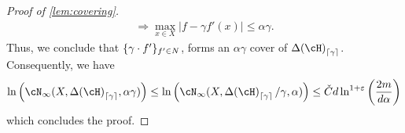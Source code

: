 \begin{proof}[Proof of \cref{lem:covering}]
\begin{align}
     \Rightarrow
     \max_{x\in X} \left|f-\gamma f'(x) \right| \leq \alpha\gamma.
    \end{align}
Thus, we conclude that $ \{ \gamma \cdot f' \}_{f'\in N } $, forms an $ \alpha \gamma $  cover of $ \dlh_{\left\lceil\gamma \right\rceil} $. Consequently, we have
    \begin{align}
        \ln\left(\cN_{\infty}(X,\dlh_{\left\lceil\gamma\right\rceil} ,\alpha \gamma)\right)\leq\ln\left(\cN_{\infty}(X,\dlh_{\left\lceil\gamma\right\rceil}/\gamma ,\alpha)\right) \leq
        \check{C} 
        d
        \ln^{1+\eps}\left(\frac{2m}{d  \alpha}\right)
    \end{align}
which concludes the proof. 
\end{proof}
